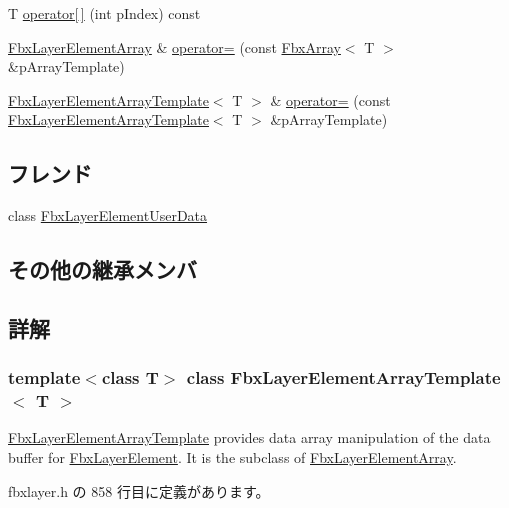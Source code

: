 \begin{DoxyCompactItemize}
\item 
T \hyperlink{class_fbx_layer_element_array_template_a1307ade46b3db83ed5cec97e2449f0de}{operator\mbox{[}$\,$\mbox{]}} (int p\+Index) const
\item 
\hyperlink{class_fbx_layer_element_array}{Fbx\+Layer\+Element\+Array} \& \hyperlink{class_fbx_layer_element_array_template_ae914766602cbb45b38ce26765095f222}{operator=} (const \hyperlink{class_fbx_array}{Fbx\+Array}$<$ T $>$ \&p\+Array\+Template)
\item 
\hyperlink{class_fbx_layer_element_array_template}{Fbx\+Layer\+Element\+Array\+Template}$<$ T $>$ \& \hyperlink{class_fbx_layer_element_array_template_a97ad38fd116a2f9ac06d04748e4601b0}{operator=} (const \hyperlink{class_fbx_layer_element_array_template}{Fbx\+Layer\+Element\+Array\+Template}$<$ T $>$ \&p\+Array\+Template)
\end{DoxyCompactItemize}
\subsection*{フレンド}
\begin{DoxyCompactItemize}
\item 
class \hyperlink{class_fbx_layer_element_array_template_a63a2f2e250c191762d21c915d679bbc9}{Fbx\+Layer\+Element\+User\+Data}
\end{DoxyCompactItemize}
\subsection*{その他の継承メンバ}


\subsection{詳解}
\subsubsection*{template$<$class T$>$\newline
class Fbx\+Layer\+Element\+Array\+Template$<$ T $>$}

\hyperlink{class_fbx_layer_element_array_template}{Fbx\+Layer\+Element\+Array\+Template} provides data array manipulation of the data buffer for \hyperlink{class_fbx_layer_element}{Fbx\+Layer\+Element}. It is the subclass of \hyperlink{class_fbx_layer_element_array}{Fbx\+Layer\+Element\+Array}. 

 fbxlayer.\+h の 858 行目に定義があります。



